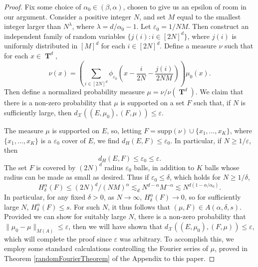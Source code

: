 \documentclass[12pt,reqno]{article}
\numberwithin{equation}{section}
\DeclareMathOperator{\TT}{\mathbf{T}}
\begin{document}
\begin{proof}
    Fix some choice of $\alpha_0 \in (\beta,\alpha)$, chosen to give us an epsilon of room in our argument. Consider a positive integer $N$, and set $M$ equal to the smallest integer larger than $N^\lambda$, where $\lambda = d/\alpha_0 - 1$. Let $\varepsilon_0 = 1/NM$. Then construct an independent family of random variables $\{ j(i) : i \in [2N]^d \}$, where $j(i)$ is uniformly distributed in $[M]^d$ for each $i \in [2N]^d$. Define a measure $\nu$ such that for each $x \in \TT^d$,
    \[ \nu(x) = \left( \sum_{i \in [2N]^d} \phi_{\varepsilon_0} \left( x - \frac{i}{2N} - \frac{j(i)}{2NM} \right) \right) \mu_0(x). \]
    Then define a normalized probability measure $\mu = \nu / \nu(\TT^d)$. We claim that there is a non-zero probability that $\mu$ is supported on a set $F$ such that, if $N$ is sufficiently large, then $d_{\mathcal{X}}((E,\mu_0),(F,\mu)) \leq \varepsilon$.

    The measure $\mu$ is supported on $E$, so, letting $F = \text{supp}(\nu) \cup \{ x_1, \dots, x_K \}$, where $\{ x_1, \dots, x_K \}$ is a $\varepsilon_0$ cover of $E$, we find $d_H(E,F) \leq \varepsilon_0$. In particular, if $N \geq 1/\varepsilon$, then
    \begin{equation} \label{equation19230124574}
        d_H(E,F) \leq \varepsilon_0 \leq \varepsilon.
    \end{equation}
    The set $F$ is covered by $(2N)^d$ radius $\varepsilon_0$ balls, in addition to $K$ balls whose radius can be made as small as desired. Thus if $\varepsilon_0 \leq \delta$, which holds for $N \geq 1/\delta$,
    \[ H^\alpha_\delta(F) \leq (2N)^d / (NM)^\alpha \lesssim_d N^{d-\alpha} M^{-\alpha} \lesssim N^{d(1 - \alpha/\alpha_0)}. \]
    In particular, for any fixed $\delta > 0$, as $N \to \infty$, $H^\alpha_\delta(F) \to 0$, so for sufficiently large $N$, $H^\alpha_\delta(F) \leq s$. For such $N$, it thus follows that $(\mu,F) \in A(\alpha,\delta,s)$. Provided we can show for suitably large $N$, there is a non-zero probability that $\| \mu_0 - \mu \|_{M(A)} \leq \varepsilon$, then we will have shown that $d_{\mathcal{X}}((E,\mu_0),(F,\mu)) \leq \varepsilon$, which will complete the proof since $\varepsilon$ was arbitrary. To accomplish this, we employ some standard calculations controlling the Fourier series of $\mu$, proved in Theorem \ref{randomFourierTheorem} of the Appendix to this paper.


\end{proof}
\end{document}
